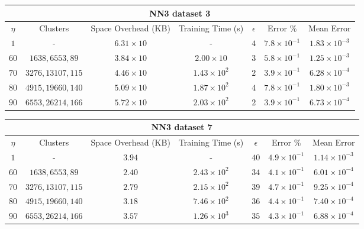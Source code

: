 \par\null\par
\par\null\par

\pagebreak

\begin{adjustwidth}{-1.5cm}{}
\begin{tabular}{ccccccc}
\hline
\multicolumn{7}{c}{NN3 dataset 3} \\
\toprule
$\eta$ & Clusters & Space Overhead (KB) & Training Time (s) & $\epsilon$ & Error \% & Mean Error\\
\midrule
$1$ & - & $6.31 \times 10$ & - & $4$ & $7.8 \times 10^{-1}$ & $1.83 \times 10^{-3}$\\
$60$ & $1638, 6553, 89$ & $3.84 \times 10$ & $2.00 \times 10$ & $3$ & $5.8 \times 10^{-1}$ & $1.25 \times 10^{-3}$\\
$70$ & $3276, 13107, 115$ & $4.46 \times 10$ & $1.43 \times 10^2$ & $2$ & $3.9 \times 10^{-1}$ & $6.28 \times 10^{-4}$\\
$80$ & $4915, 19660, 140$ & $5.09 \times 10$ & $1.87 \times 10^2$ & $4$ & $7.8 \times 10^{-1}$ & $1.80 \times 10^{-3}$\\
$90$ & $6553, 26214, 166$ & $5.72 \times 10$ & $2.03 \times 10^2$ & $2$ & $3.9 \times 10^{-1}$ & $6.73 \times 10^{-4}$\\
\bottomrule
\end{tabular}
\end{adjustwidth}

\par\null\par
\par\null\par

\begin{adjustwidth}{-1.5cm}{}
\begin{tabular}{ccccccc}
\hline
\multicolumn{7}{c}{NN3 dataset 7} \\
\toprule
$\eta$ & Clusters & Space Overhead (KB) & Training Time (s) & $\epsilon$ & Error \% & Mean Error\\
\midrule
$1$  & - & $3.94$ & - & $40$ & $4.9 \times 10^{-1}$ & $1.14 \times 10^{-3}$\\
$60$ & $1638, 6553, 89$ & $2.40$ & $2.43 \times 10^2$ & $34$ & $4.1 \times 10^{-1}$ & $6.01 \times 10^{-4}$\\
$70$ & $3276, 13107, 115$ & $2.79$ & $2.15 \times 10^2$ & $39$ & $4.7 \times 10^{-1}$ & $9.25 \times 10^{-4}$\\
$80$ & $4915, 19660, 140$ & $3.18$ & $7.46 \times 10^2$ & $36$ & $4.4 \times 10^{-1}$ & $7.40 \times 10^{-4}$\\
$90$ & $6553, 26214, 166$ & $3.57$ & $1.26 \times 10^3$ & $35$ & $4.3 \times 10^{-1}$ & $6.88 \times 10^{-4}$\\
\bottomrule
\end{tabular}
\end{adjustwidth}


